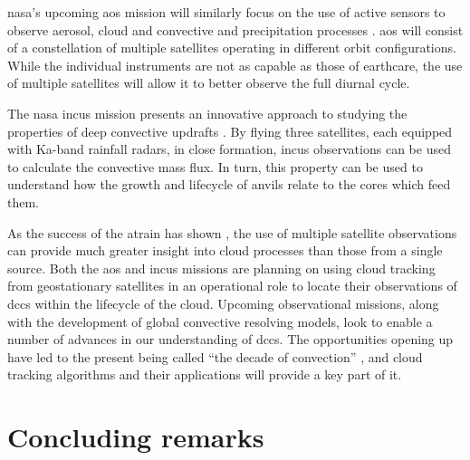 \acrshort{nasa}'s upcoming \acrfull{aos} mission will similarly focus on the use of active sensors to observe aerosol, cloud and convective and precipitation processes \citep{braun_nasa_2023}.
\acrshort{aos} will consist of a constellation of multiple satellites operating in different orbit configurations.
While the individual instruments are not as capable as those of \acrshort{earthcare}, the use of multiple satellites will allow it to better observe the full diurnal cycle.

The \acrshort{nasa} \acrfull{incus} mission presents an innovative approach to studying the properties of deep convective updrafts \citep{vandenheever_tropical_2023}.
By flying three satellites, each equipped with Ka-band rainfall radars, in close formation, \acrshort{incus} observations can be used to calculate the convective mass flux.
In turn, this property can be used to understand how the growth and lifecycle of anvils relate to the cores which feed them.

As the success of the \acrshort{atrain} has shown \citep{stephens_cloudsat_2018}, the use of multiple satellite observations can provide much greater insight into cloud processes than those from a single source.
Both the \acrshort{aos} and \acrshort{incus} missions are planning on using cloud tracking from geostationary satellites in an operational role to locate their observations of \acrshort{dcc}s within the lifecycle of the cloud.
Upcoming observational missions, along with the development of global convective resolving models, look to enable a number of advances in our understanding of \acrshort{dcc}s.
The opportunities opening up have led to the present being called ``the decade of convection'' \citep{vandenheever_tropical_2023}, and cloud tracking algorithms and their applications will provide a key part of it.




\section{Concluding remarks}


